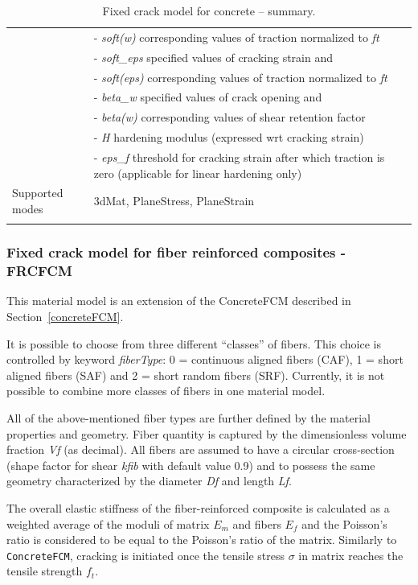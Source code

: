 \documentclass[a4paper]{article}
\newcommand{\param}[1]{{\it #1}}
\begin{document}
\begin{longtable}{|l|p{9cm}|}
&- \param{soft(w)} corresponding values of traction normalized to \param{ft}\\
&- \param{soft\_eps} specified values of cracking strain and \\
&- \param{soft(eps)} corresponding values of traction normalized to \param{ft}\\
&- \param{beta\_w} specified values of crack opening and \\
&- \param{beta(w)} corresponding values of shear retention factor\\
&- \param{H} hardening modulus (expressed wrt cracking strain)\\
&- \param{eps\_f} threshold for cracking strain after which traction is zero (applicable for linear hardening only) \\
Supported modes& 3dMat, PlaneStress, PlaneStrain\\
\hline
\caption{Fixed crack model for concrete -- summary.}
\label{concrete_fcm_table}
\end{longtable}

\subsubsection{Fixed crack model for fiber reinforced composites - FRCFCM}

This material model is an extension of the ConcreteFCM described in Section~\ref{concreteFCM}.

It is possible to choose from three different ``classes'' of fibers. This choice is controlled by keyword \param{fiberType}: 0 = continuous aligned fibers (CAF), 1 = short aligned fibers (SAF) and 2 = short random fibers (SRF). Currently, it is not possible to combine more classes of fibers in one material model.

All of the above-mentioned fiber types are further defined by the material properties and geometry. Fiber quantity is captured by the dimensionless volume fraction \param{Vf} (as decimal). All fibers are assumed to have a circular cross-section (shape factor for shear \param{kfib} with default value 0.9) and to possess the same geometry characterized by the diameter \param{Df} and length \param{Lf}.

The overall elastic stiffness of the fiber-reinforced composite is calculated as a weighted average of the moduli of matrix $E_m$ and fibers $E_f$ and the Poisson's ratio is considered to be equal to the Poisson's ratio of the matrix. Similarly to \texttt{ConcreteFCM}, cracking is initiated once the tensile stress $\sigma$ in matrix reaches the tensile strength $f_t$.
\end{document}
